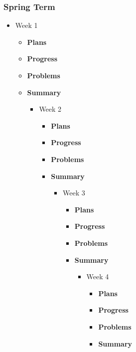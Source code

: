	\subsubsection{Spring Term}
	\begin{itemize}
		\item{Week 1}
			\begin{itemize}
				\item \textbf{Plans} \\
				\item \textbf{Progress} \\
				\item \textbf{Problems} \\
				\item \textbf{Summary} \\
			\begin{itemize}

		\item{Week 2}
			\begin{itemize}
				\item \textbf{Plans} \\
				\item \textbf{Progress} \\
				\item \textbf{Problems} \\
				\item \textbf{Summary} \\
			\begin{itemize}

		\item{Week 3}
			\begin{itemize}
				\item \textbf{Plans} \\
				\item \textbf{Progress} \\
				\item \textbf{Problems} \\
				\item \textbf{Summary} \\
			\begin{itemize}

		\item{Week 4}
			\begin{itemize}
				\item \textbf{Plans} \\
				\item \textbf{Progress} \\
				\item \textbf{Problems} \\
				\item \textbf{Summary} \\
			\begin{itemize}


\end{itemize}
\end{itemize}
\end{itemize}
\end{itemize}
\end{itemize}
\end{itemize}
\end{itemize}
\end{itemize}
\end{itemize}
